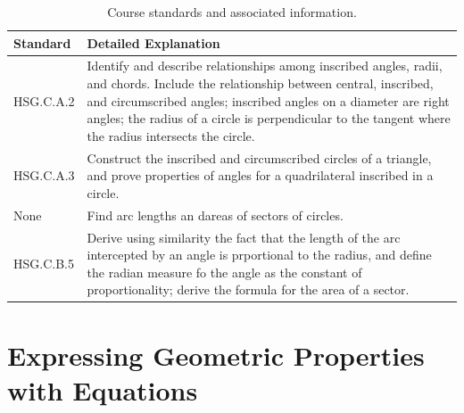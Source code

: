 \documentclass[12pt, oneside]{book}
\begin{document}
\begin{table}[h]
    \centering
    \caption{Course standards and associated information.}
    \vspace{0.3cm} %
    \begin{tabularx}{\textwidth}{l X} %
        \toprule
        \textbf{Standard} & \textbf{Detailed Explanation} \\
        \midrule
        HSG.C.A.2 & Identify and describe relationships among inscribed angles, radii, and chords. Include the relationship between central, inscribed, and circumscribed angles; inscribed angles on a diameter are right angles; the radius of a circle is perpendicular to the tangent where the radius intersects the circle. \\
        HSG.C.A.3 & Construct the inscribed and circumscribed circles of a triangle, and prove properties of angles for a quadrilateral inscribed in a circle. \\
        None & Find arc lengths an dareas of sectors of circles. \\
        HSG.C.B.5 & Derive using similarity the fact that the length of the arc intercepted by an angle is prportional to the radius, and define the radian measure fo the angle as the constant of proportionality; derive the formula for the area of a sector. \\
        \bottomrule
    \end{tabularx}
\end{table}

\chapter{Expressing Geometric Properties with Equations}
\end{document}
